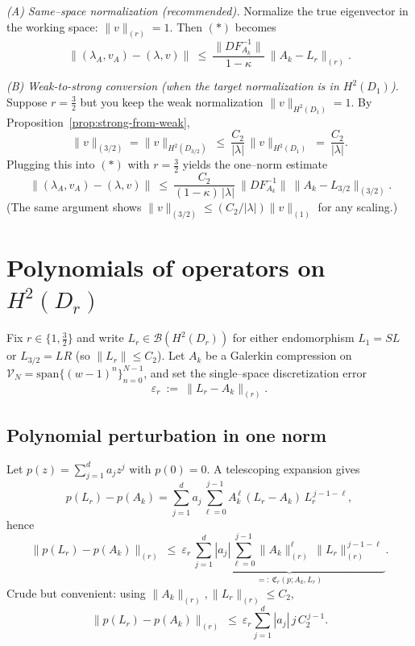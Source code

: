 \documentclass[11pt]{article}
\begin{document}
\smallskip
\noindent\emph{(A) Same–space normalization (recommended).}
Normalize the true eigenvector in the working space: $\|v\|_{(r)}=1$.
Then $(\ast)$ becomes
\[
\big\|(\lambda_A,v_A)-(\lambda,v)\big\|
\ \le\ \frac{\|DF_{A_k}^{-1}\|}{1-\kappa}\ \|A_k-L_r\|_{(r)}.
\]

\smallskip
\noindent\emph{(B) Weak-to-strong conversion (when the target normalization is in $H^2(D_1)$).}
Suppose $r=\tfrac32$ but you keep the weak normalization $\|v\|_{H^2(D_1)}=1$.
By Proposition~\ref{prop:strong-from-weak},
\[
\|v\|_{(3/2)}=\|v\|_{H^2(D_{3/2})}\ \le\ \frac{C_2}{|\lambda|}\,\|v\|_{H^2(D_1)}
\ =\ \frac{C_2}{|\lambda|}.
\]
Plugging this into $(\ast)$ with $r=\tfrac32$ yields the one–norm estimate
\[
\boxed{\qquad
\big\|(\lambda_A,v_A)-(\lambda,v)\big\|
\ \le\ \frac{C_2}{(1-\kappa)\,|\lambda|}\ \|DF_{A_k}^{-1}\|\ \|A_k-L_{3/2}\|_{(3/2)}.
\qquad}
\]
(The same argument shows $\|v\|_{(3/2)}\le (C_2/|\lambda|)\|v\|_{(1)}$ for any scaling.)



\section{Polynomials of operators on \texorpdfstring{$H^2(D_r)$}{H2(Dr)}}
\label{sec:poly-single}

Fix \(r\in\{1,\tfrac32\}\) and write \(L_r\in\mathcal B(H^2(D_r))\) for either endomorphism
\(L_1=SL\) or \(L_{3/2}=LR\) (so \(\|L_r\|\le C_2\)).
Let \(A_k\) be a Galerkin compression on \(\mathcal V_N=\mathrm{span}\{(w-1)^n\}_{n=0}^{N-1}\),
and set the single–space discretization error
\[
\varepsilon_r\ :=\ \|L_r-A_k\|_{(r)}.
\]

\subsection{Polynomial perturbation in one norm}
Let \(p(z)=\sum_{j=1}^{d} a_j z^j\) with \(p(0)=0\).
A telescoping expansion gives
\[
p(L_r)-p(A_k)
=\sum_{j=1}^{d} a_j \sum_{\ell=0}^{j-1}
A_k^{\,\ell}\,(L_r-A_k)\,L_r^{\,j-1-\ell},
\]
hence
\begin{equation}\label{eq:poly-perturb-single}
\boxed{\quad
\|p(L_r)-p(A_k)\|_{(r)}
\ \le\ \varepsilon_r\,
\underbrace{\sum_{j=1}^{d} |a_j|\sum_{\ell=0}^{j-1}
\|A_k\|_{(r)}^{\ell}\,\|L_r\|_{(r)}^{\,j-1-\ell}}_{=:~\mathfrak C_r(p;A_k,L_r)}.
\quad}
\end{equation}
Crude but convenient: using \(\|A_k\|_{(r)},\|L_r\|_{(r)}\le C_2\),
\begin{equation}\label{eq:poly-perturb-C2}
\|p(L_r)-p(A_k)\|_{(r)}
\ \le\ \varepsilon_r \sum_{j=1}^{d} |a_j|\,j\,C_2^{\,j-1}.
\end{equation}
\end{document}
